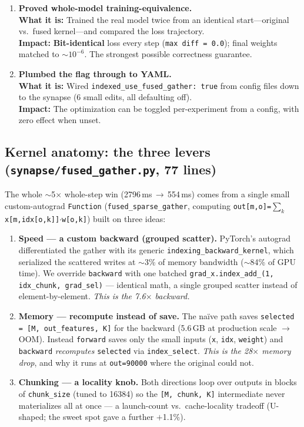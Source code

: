 \documentclass[11pt]{article}
\newcommand{\what}[1]{\textbf{What it is:} #1}
\newcommand{\impact}[1]{\textbf{Impact:} #1}
\begin{document}
\begin{enumerate}[leftmargin=*, resume]
\item \textbf{Proved whole-model training-equivalence.}\\
\what{Trained the real model twice from an identical start---original vs.\ fused kernel---and
compared the loss trajectory.}\\
\impact{\textbf{Bit-identical} loss every step (\texttt{max diff = 0.0}); final weights matched
to $\sim$$10^{-6}$. The strongest possible correctness guarantee.}

\item \textbf{Plumbed the flag through to YAML.}\\
\what{Wired \texttt{indexed\_use\_fused\_gather: true} from config files down to the synapse
(6 small edits, all defaulting off).}\\
\impact{The optimization can be toggled per-experiment from a config, with zero effect when unset.}

\end{enumerate}

\subsection*{Kernel anatomy: the three levers (\texttt{synapse/fused\_gather.py}, 77 lines)}

The whole $\sim$5$\times$ whole-step win (2796\,ms\,$\to$\,554\,ms) comes from a single small
custom-autograd \texttt{Function} (\texttt{fused\_sparse\_gather}, computing
\texttt{out[m,o]=$\sum_k$x[m,idx[o,k]]$\cdot$w[o,k]}) built on three ideas:

\begin{enumerate}[leftmargin=*, itemsep=2pt]
\item \textbf{Speed --- a custom backward (grouped scatter).} PyTorch's autograd differentiated
the gather with its generic \texttt{indexing\_backward\_kernel}, which serialized the scattered
writes at $\sim$3\% of memory bandwidth ($\sim$84\% of GPU time). We override \texttt{backward} with
one batched \texttt{grad\_x.index\_add\_(1, idx\_chunk, grad\_sel)} --- identical math, a single
grouped scatter instead of element-by-element. \emph{This is the 7.6$\times$ backward.}

\item \textbf{Memory --- recompute instead of save.} The na\"ive path saves
\texttt{selected\,=\,[M, out\_features, K]} for the backward (5.6\,GB at production scale
$\to$ OOM). Instead \texttt{forward} saves only the small inputs (\texttt{x}, \texttt{idx},
\texttt{weight}) and \texttt{backward} \emph{recomputes} \texttt{selected} via
\texttt{index\_select}. \emph{This is the 28$\times$ memory drop}, and why it runs at
\texttt{out=90000} where the original could not.

\item \textbf{Chunking --- a locality knob.} Both directions loop over outputs in blocks of
\texttt{chunk\_size} (tuned to 16384) so the \texttt{[M, chunk, K]} intermediate never
materializes all at once --- a launch-count vs.\ cache-locality tradeoff (U-shaped; the sweet
spot gave a further $+$1.1\%).
\end{enumerate}
\end{document}
